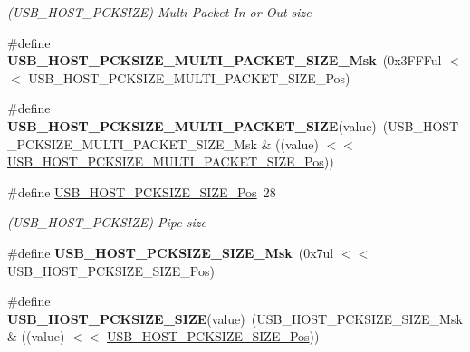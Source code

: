 \begin{DoxyCompactItemize}
\begin{DoxyCompactList}\small\item\em (U\+S\+B\+\_\+\+H\+O\+S\+T\+\_\+\+P\+C\+K\+S\+I\+Z\+E) Multi Packet In or Out size \end{DoxyCompactList}\item 
\hypertarget{group___s_a_m_l21___u_s_b_ga98146e83a2143cd3b2021f3353f3d040}{}\#define {\bfseries U\+S\+B\+\_\+\+H\+O\+S\+T\+\_\+\+P\+C\+K\+S\+I\+Z\+E\+\_\+\+M\+U\+L\+T\+I\+\_\+\+P\+A\+C\+K\+E\+T\+\_\+\+S\+I\+Z\+E\+\_\+\+Msk}~(0x3\+F\+F\+Ful $<$$<$ U\+S\+B\+\_\+\+H\+O\+S\+T\+\_\+\+P\+C\+K\+S\+I\+Z\+E\+\_\+\+M\+U\+L\+T\+I\+\_\+\+P\+A\+C\+K\+E\+T\+\_\+\+S\+I\+Z\+E\+\_\+\+Pos)\label{group___s_a_m_l21___u_s_b_ga98146e83a2143cd3b2021f3353f3d040}

\item 
\hypertarget{group___s_a_m_l21___u_s_b_gab3063dadbc81ff0f31495d07f07c7bec}{}\#define {\bfseries U\+S\+B\+\_\+\+H\+O\+S\+T\+\_\+\+P\+C\+K\+S\+I\+Z\+E\+\_\+\+M\+U\+L\+T\+I\+\_\+\+P\+A\+C\+K\+E\+T\+\_\+\+S\+I\+Z\+E}(value)~(U\+S\+B\+\_\+\+H\+O\+S\+T\+\_\+\+P\+C\+K\+S\+I\+Z\+E\+\_\+\+M\+U\+L\+T\+I\+\_\+\+P\+A\+C\+K\+E\+T\+\_\+\+S\+I\+Z\+E\+\_\+\+Msk \& ((value) $<$$<$ \hyperlink{group___s_a_m_l21___u_s_b_ga5f8e56dec62e103c573bc4ffa746ca08}{U\+S\+B\+\_\+\+H\+O\+S\+T\+\_\+\+P\+C\+K\+S\+I\+Z\+E\+\_\+\+M\+U\+L\+T\+I\+\_\+\+P\+A\+C\+K\+E\+T\+\_\+\+S\+I\+Z\+E\+\_\+\+Pos}))\label{group___s_a_m_l21___u_s_b_gab3063dadbc81ff0f31495d07f07c7bec}

\item 
\hypertarget{group___s_a_m_l21___u_s_b_gad23df7ffc2596d74fe96e78df45ef815}{}\#define \hyperlink{group___s_a_m_l21___u_s_b_gad23df7ffc2596d74fe96e78df45ef815}{U\+S\+B\+\_\+\+H\+O\+S\+T\+\_\+\+P\+C\+K\+S\+I\+Z\+E\+\_\+\+S\+I\+Z\+E\+\_\+\+Pos}~28\label{group___s_a_m_l21___u_s_b_gad23df7ffc2596d74fe96e78df45ef815}

\begin{DoxyCompactList}\small\item\em (U\+S\+B\+\_\+\+H\+O\+S\+T\+\_\+\+P\+C\+K\+S\+I\+Z\+E) Pipe size \end{DoxyCompactList}\item 
\hypertarget{group___s_a_m_l21___u_s_b_gaa4b95577c1183d52326291c7b5865ece}{}\#define {\bfseries U\+S\+B\+\_\+\+H\+O\+S\+T\+\_\+\+P\+C\+K\+S\+I\+Z\+E\+\_\+\+S\+I\+Z\+E\+\_\+\+Msk}~(0x7ul $<$$<$ U\+S\+B\+\_\+\+H\+O\+S\+T\+\_\+\+P\+C\+K\+S\+I\+Z\+E\+\_\+\+S\+I\+Z\+E\+\_\+\+Pos)\label{group___s_a_m_l21___u_s_b_gaa4b95577c1183d52326291c7b5865ece}

\item 
\hypertarget{group___s_a_m_l21___u_s_b_ga98a22e51e8e676a4e0b66d45e11a7133}{}\#define {\bfseries U\+S\+B\+\_\+\+H\+O\+S\+T\+\_\+\+P\+C\+K\+S\+I\+Z\+E\+\_\+\+S\+I\+Z\+E}(value)~(U\+S\+B\+\_\+\+H\+O\+S\+T\+\_\+\+P\+C\+K\+S\+I\+Z\+E\+\_\+\+S\+I\+Z\+E\+\_\+\+Msk \& ((value) $<$$<$ \hyperlink{group___s_a_m_l21___u_s_b_gad23df7ffc2596d74fe96e78df45ef815}{U\+S\+B\+\_\+\+H\+O\+S\+T\+\_\+\+P\+C\+K\+S\+I\+Z\+E\+\_\+\+S\+I\+Z\+E\+\_\+\+Pos}))\label{group___s_a_m_l21___u_s_b_ga98a22e51e8e676a4e0b66d45e11a7133}


\end{DoxyCompactItemize}
